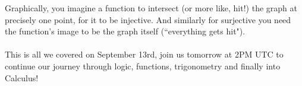 \documentclass{article}
\begin{document}
Graphically, you imagine a function to intersect (or more like, hit!) the graph at precisely one point, for it to be injective. And similarly for surjective you need the function's image to be the graph itself (``everything gets hit"). 
\\
\\
This is all we covered on September 13rd, join us tomorrow at 2PM UTC to continue our journey through logic, functions, trigonometry and finally into Calculus! 
\end{document}
